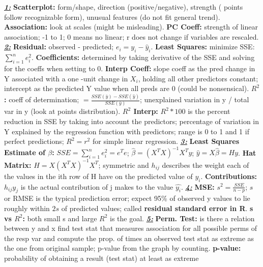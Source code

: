 \documentclass[8pt]{extarticle}
\begin{document}

\textit{\textbf{\underline{1:}}}
\textbf{Scatterplot:} form/shape, direction (positive/negative), strength (
points follow recognizable form), unusual features (do not fit general trend).
\textbf{Association:} look at scales (might be misleading).
\textbf{PC Coeff:} strength of linear association; -1 to 1; 0 means no linear; r
does not change if variables are rescaled.
\textit{\textbf{\underline{2:}}}
\textbf{Residual:} observed - predicted; $e_i = y_i - \hat{y}_i$.
\textbf{Least Squares:} minimize SSE: $\sum_{i=1}^{n} e_i^2$.
\textbf{Coefficients:} determined by taking derivative of the SSE and solving
for the coeffs when setting to 0.
\textbf{Interp Coeff:} slope coeff as the pred change in Y associated with a one
-unit change in $X_i$, holding all other predictors constant; intercept as the 
predicted Y value when all preds are 0 (could be nonsensical).
\textbf{$R^2$:} coeff of determination; $ = \frac{SSE(\bar{y}) - SSE(\hat{y})}{SSE(\bar{y})}$;
unexplained variation in y / total var in y (look at points distribution).
\textbf{$R^2$ Interp:} $R^2 * 100$ is the percent reduction in SSE by taking into
account the predictors; percentage of variation in Y explained by the regression 
function with predictors; range is 0 to 1 and 1 if perfect predictions; $R^2 = r^2$
for simple linear regression.
\textit{\textbf{\underline{3:}}}
\textbf{Least Squares Estimate of $\beta$:} $SSE = \sum_{i=1}^{n} e^2_i = e^Te$;
$\hat{\beta} = (X^TX)^{-1}X^Ty$; $\hat{y} = X\hat{\beta} = Hy$.
\textbf{Hat Matrix:} $H = X(X^TX)^{-1}X^T$; symmetric and $h_{ij}$ describes 
the weight each of the values in the ith row of H have on the predicted value 
of $y_i$.
\textbf{Contributions:} $h_{ij}y_j$ is the actual contribution of j makes to the 
value $\hat{y_i}$.
\textit{\textbf{\underline{4:}}}
\textbf{MSE:} $s^2 = \frac{SSE}{n - p}$; $s$ or RMSE is the typical prediction 
error; expect 95\% of observed y values to lie roughly within $2s$ of predicted 
values; called \textbf{residual standard error in R}.
\textbf{s vs $R^2$:} both small s and large $R^2$ is the goal.
\textit{\textbf{\underline{5:}}}
\textbf{Perm. Test:} is there a relation between y and x find test stat that 
measures association for all possible perms of the resp var and compute the prop.
of times an observed test stat as extreme as the one from original sample; p-value 
from the graph by counting.
\textbf{p-value:} probability of obtaining a result (test stat) at least as extreme 
\end{document}
